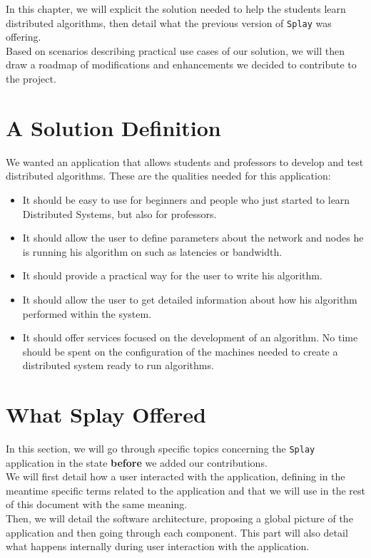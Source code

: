 \documentclass{eplmastersthesis}
\begin{document}
    In this chapter, we will explicit the solution needed to help the
    students learn distributed algorithms, then detail what the previous
    version of \texttt{Splay} was offering.\\
    Based on scenarios describing practical use cases of our solution, we will
    then draw a roadmap of modifications and enhancements we decided to
    contribute to the project.

    \section{A Solution Definition}

      We wanted an application that allows students and professors to develop
      and test distributed algorithms. These are the qualities needed for this
      application:

      \begin{itemize}
        \item It should be easy to use for beginners and people
        who just started to learn Distributed Systems, but also for professors.
        \item It should allow the user to define parameters about
        the network and nodes he is running his algorithm on such as latencies
        or bandwidth.
        \item It should provide a practical way for the user
        to write his algorithm.
        \item It should allow the user to get detailed information
        about how his algorithm performed within the system.
        \item It should offer services focused on the development
        of an algorithm. No time should be spent on the configuration of the
        machines needed to create a distributed system ready to run algorithms.
      \end{itemize}

    \section{What Splay Offered}

      In this section, we will go through specific topics concerning the \texttt{Splay}
      application in the state \textbf{before} we added our contributions.\\
      We will first detail how a user interacted with the application,
      defining in the meantime specific terms related to
      the application and that we will use in the rest of this document with
      the same meaning.\\
      Then, we will detail the software architecture, proposing a global
      picture of the application and then going through each component. This
      part will also detail what happens internally during user interaction
      with the application.
\end{document}
